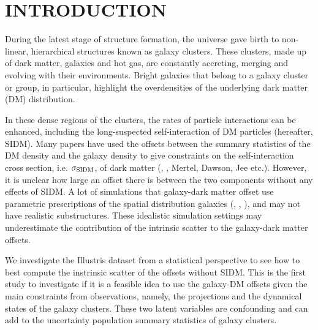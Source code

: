 
\section{INTRODUCTION} 
During the latest stage of structure formation, the universe gave birth to
non-linear, hierarchical structures known as galaxy clusters. 
These clusters, made up of dark matter, galaxies and hot gas,
are constantly accreting, merging and evolving with their
environments. Bright galaxies that belong to a galaxy cluster or group, in 
particular, highlight the overdensities of the underlying dark matter (DM) 
distribution. 


In these dense regions of the clusters, the rates of particle
interactions can be enhanced, including the long-suspected self-interaction of DM
particles (hereafter, SIDM). 
Many papers have used the offsets between the summary statistics of the DM
density and the galaxy density  to give constraints on 
the self-interaction cross
section, i.e. $\sigma_{\rm SIDM}$, of dark matter (\citealt{Markevitch2004}, \citealt{Bradac2006b}, 
Mertel, Dawson, Jee etc.). However, it is unclear how large an offset there is 
between the two components without any effects of SIDM. 
A lot of simulations that galaxy-dark matter offset use
parametric prescriptions of the spatial distribution galaxies 
(\citealt{Kahlhoefer14}, \citealt{Markevitch2004}, \citealt{Robertson2016}), and may not have
realistic substructures. These idealistic simulation settings may underestimate
the contribution of the intrinsic scatter to the galaxy-dark matter offsets. 

We investigate the Illustris dataset from a statistical perspective to see how
to best compute the instrinsic scatter of the offsets without SIDM.  
This is the first study to investigate if it is a feasible
idea to use the galaxy-DM offsets given the main constraints from observations,
namely, the projections and the dynamical states of the galaxy clusters. These
two latent variables are confounding and can add to the uncertainty 
population summary statistics of galaxy clusters.  

